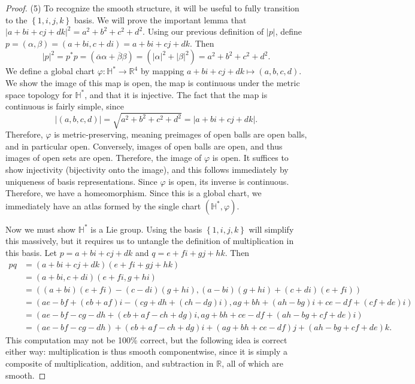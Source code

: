 \documentclass[11pt, letterpaper]{article}
\theoremstyle{plain}
\begin{document}
\begin{proof}
	(5) To recognize the smooth structure, it will be useful to fully transition to the $\left\{ 1,i,j,k \right\} $ basis. We will prove the important lemma that $\left| a+bi+cj+dk \right|^2 =a^2+b^2+c^2+d^2$. Using our previous definition of $\left| p \right| $, define $p=(\alpha ,\beta )=(a+bi,c+di)=a+bi+cj+dk$. Then
	\[
		\left| p \right|^2 =p^*p=\left( \overline{\alpha } \alpha + \overline{\beta } \beta  \right) =\left( \left| \alpha  \right| ^2+\left| \beta  \right| ^2 \right) =a^2+b^2+c^2+d^2
	.\]
	We define a global chart $\varphi :\mathbb{H} ^*\to \mathbb{R} ^4$ by mapping $a+bi+cj+dk\mapsto (a,b,c,d)$. We show the image of this map is open, the map is continuous under the metric space topology for $\mathbb{H} ^*$, and that it is injective. The fact that the map is continuous is fairly simple, since
	\[
		\left| (a,b,c,d) \right| =\sqrt{a^2+b^2+c^2+d^2} =\left| a+bi+cj+dk \right| 
	.\]
	Therefore, $\varphi $ is metric-preserving, meaning preimages of open balls are open balls, and in particular open. Conversely, images of open balls are open, and thus images of open sets are open. Therefore, the image of $\varphi $ is open. It suffices to show injectivity (bijectivity onto the image), and this follows immediately by uniqueness of basis representations. Since $\varphi $ is open, its inverse is continuous. Therefore, we have a homeomorphism. Since this is a global chart, we immediately have an atlas formed by the single chart $(\mathbb{H} ^*,\varphi )$.

	Now we must show $\mathbb{H}^*$ is a Lie group. Using the basis $\left\{ 1,i,j,k \right\} $ will simplify this massively, but it requires us to untangle the definition of multiplication in this basis. Let $p=a+bi+cj+dk$ and $q=e+fi+gj+hk$. Then
	\begin{align*}
		pq&=\left( a+bi+cj+dk \right) \left( e+fi+gj+hk \right) \\
		  &=\left( a+bi,c+di \right) \left( e+fi,g+hi \right) \\
		  &=\left( (a+bi)(e+fi)-(c-di)(g+hi),(a-bi)(g+hi)+(c+di)(e+fi) \right) \\
		  &=\left( ae-bf+(eb+af)i-(cg+dh+(ch-dg)i),ag+bh+(ah-bg)i+ce-df+(cf+de)i \right) \\
		  &=\left( ae-bf-cg-dh+(eb+af-ch+dg)i,ag+bh+ce-df+(ah-bg+cf+de)i \right) \\
		  &=(ae-bf-cg-dh)+(eb+af-ch+dg)i+(ag+bh+ce-df)j+(ah-bg+cf+de)k
	.\end{align*}
	This computation may not be 100\% correct, but the following idea is correct either way: multiplication is thus smooth componentwise, since it is simply a composite of multiplication, addition, and subtraction in $\mathbb{R} $, all of which are smooth.


\end{proof}
\end{document}
